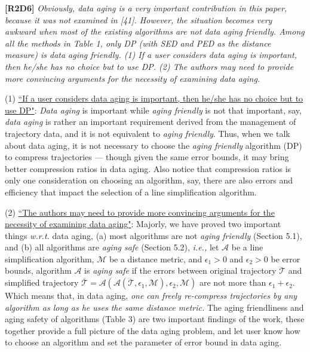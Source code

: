 \documentclass{letter}
\newcommand{\ie}{\emph{i.e.,}\xspace}
\newcommand{\wrt}{\emph{w.r.t.}\xspace}
\begin{document}
{{\textbf{[R2D6]} \emph{Obviously, data aging is a very important contribution in this paper, because it was not examined in [41]. However, the situation becomes very awkward when most of the existing algorithms are not data aging friendly. Among all the methods in Table 1, only DP (with SED and PED as the distance measure) is data aging friendly. (1) {If a user considers data aging is important, then he/she has no choice but to use DP}. (2) {The authors may need to provide more convincing arguments for the necessity of examining data aging}.}



(1) \underline{``If a user considers data aging is important, then he/she has no choice but to use DP"}: \emph{Data aging} is important while \emph{aging friendly} is not that important, say, \emph{data aging} is rather an important requirement derived from the management of trajectory data, and it is not equivalent to \emph{aging friendly}. Thus, when we talk about data aging, it is not necessary to choose the \emph{aging friendly} algorithm (DP) to compress trajectories --- though given the same error bounds, it may bring better compression ratios in data aging. Also notice that compression ratios is only one consideration on choosing an algorithm, say, there are also errors and efficiency that impact the selection of a line simplification algorithm.

(2) \underline{``The authors may need to provide more convincing arguments for the necessity of examining data aging"}: Majorly, we have proved two important things \wrt data aging, (a) most algorithms are not \emph{aging friendly} (Section 5.1), and (b) all algorithms are \emph{aging safe} (Section 5.2), \ie let $\mathcal{A}$ be a line simplification algorithm,  $\mathcal{M}$ be a distance metric, and $\epsilon_1>0$ and $\epsilon_2>0$ be error bounds, algorithm $\mathcal{A}$ is \emph{aging safe} if the errors between original trajectory $\dddot{\mathcal{T}}$ and simplified trajectory $\overline{\mathcal{T}}=\mathcal{A}(\mathcal{A}(\dddot{\mathcal{T}}, \epsilon_1, \mathcal{M}), \epsilon_2, \mathcal{M})$ are not more than $\epsilon_1+ \epsilon_2$. Which means that, in data aging, \emph{one can freely re-compress trajectories by any algorithm as long as he uses the same distance metric.} The aging friendliness and aging safety of algorithms (Table 3) are two important findings of the work, these together provide a full picture of the data aging problem, and let user know how to choose an algorithm and set the parameter of error bound in data aging. 

}}
\end{document}

